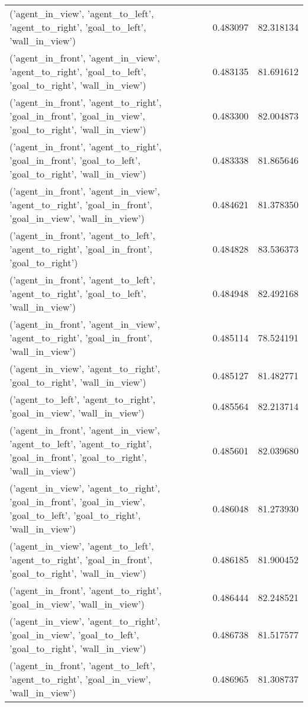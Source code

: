 \begin{tabular}{lrr}
('agent\_in\_view', 'agent\_to\_left', 'agent\_to\_right', 'goal\_to\_left', 'wall\_in\_view') & 0.483097 & 82.318134 \\
('agent\_in\_front', 'agent\_in\_view', 'agent\_to\_right', 'goal\_to\_left', 'goal\_to\_right', 'wall\_in\_view') & 0.483135 & 81.691612 \\
('agent\_in\_front', 'agent\_to\_right', 'goal\_in\_front', 'goal\_in\_view', 'goal\_to\_right', 'wall\_in\_view') & 0.483300 & 82.004873 \\
('agent\_in\_front', 'agent\_to\_right', 'goal\_in\_front', 'goal\_to\_left', 'goal\_to\_right', 'wall\_in\_view') & 0.483338 & 81.865646 \\
('agent\_in\_front', 'agent\_in\_view', 'agent\_to\_right', 'goal\_in\_front', 'goal\_in\_view', 'wall\_in\_view') & 0.484621 & 81.378350 \\
('agent\_in\_front', 'agent\_to\_left', 'agent\_to\_right', 'goal\_in\_front', 'goal\_to\_right') & 0.484828 & 83.536373 \\
('agent\_in\_front', 'agent\_to\_left', 'agent\_to\_right', 'goal\_to\_left', 'wall\_in\_view') & 0.484948 & 82.492168 \\
('agent\_in\_front', 'agent\_in\_view', 'agent\_to\_right', 'goal\_in\_front', 'wall\_in\_view') & 0.485114 & 78.524191 \\
('agent\_in\_view', 'agent\_to\_right', 'goal\_to\_right', 'wall\_in\_view') & 0.485127 & 81.482771 \\
('agent\_to\_left', 'agent\_to\_right', 'goal\_in\_view', 'wall\_in\_view') & 0.485564 & 82.213714 \\
('agent\_in\_front', 'agent\_in\_view', 'agent\_to\_left', 'agent\_to\_right', 'goal\_in\_front', 'goal\_to\_right', 'wall\_in\_view') & 0.485601 & 82.039680 \\
('agent\_in\_view', 'agent\_to\_right', 'goal\_in\_front', 'goal\_in\_view', 'goal\_to\_left', 'goal\_to\_right', 'wall\_in\_view') & 0.486048 & 81.273930 \\
('agent\_in\_view', 'agent\_to\_left', 'agent\_to\_right', 'goal\_in\_front', 'goal\_to\_right', 'wall\_in\_view') & 0.486185 & 81.900452 \\
('agent\_in\_front', 'agent\_to\_right', 'goal\_in\_view', 'wall\_in\_view') & 0.486444 & 82.248521 \\
('agent\_in\_view', 'agent\_to\_right', 'goal\_in\_view', 'goal\_to\_left', 'goal\_to\_right', 'wall\_in\_view') & 0.486738 & 81.517577 \\
('agent\_in\_front', 'agent\_to\_left', 'agent\_to\_right', 'goal\_in\_view', 'wall\_in\_view') & 0.486965 & 81.308737 \\

\end{tabular}
